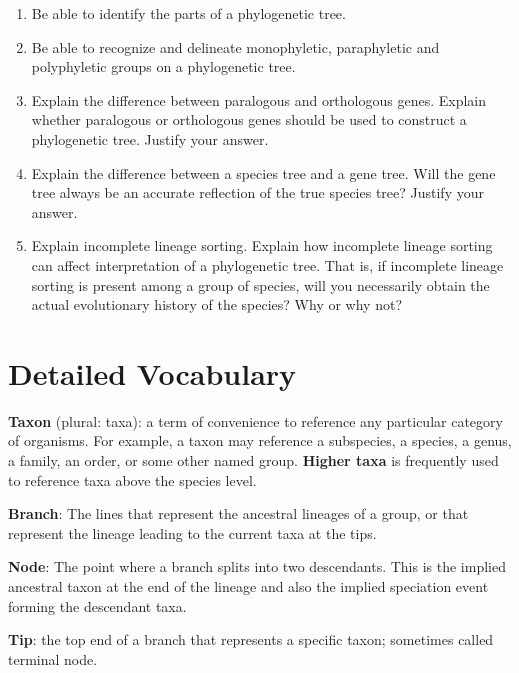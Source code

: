 \documentclass[letterpaper]{tufte-handout}
\begin{document}
\begin{enumerate}
	
	\item Be able to identify the parts of a phylogenetic tree.
	
	\item Be able to recognize and delineate monophyletic, paraphyletic and polyphyletic groups on a phylogenetic tree.

	\item Explain the difference between paralogous and orthologous genes. Explain whether paralogous or orthologous genes should be used to construct a phylogenetic tree. Justify your answer.
	
	\item Explain the difference between a species tree and a gene tree. Will the gene tree always be an accurate reflection of the true species tree? Justify your answer.
	
	\item Explain incomplete lineage sorting. Explain how incomplete lineage sorting can affect interpretation of a phylogenetic tree. That is, if incomplete lineage sorting is present among a group of species, will you necessarily obtain the actual evolutionary history of the species? Why or why not?
	
	

\end{enumerate}

\section{Detailed Vocabulary}

\textbf{Taxon} (plural: taxa): a term of convenience to reference any particular category of organisms. For example, a taxon may reference a subspecies, a species, a genus, a family, an order, or some other named group. \textbf{Higher taxa} is frequently used to reference taxa above the species level.

\noindent\textbf{Branch}: The lines that represent the ancestral lineages of a group, or that represent the lineage leading to the current taxa at the tips.

\noindent\textbf{Node}: The point where a branch splits into two descendants.  This is the implied ancestral taxon at the end of the lineage and also the implied speciation event forming the descendant taxa.

\noindent\textbf{Tip}: the top end of a branch that represents a specific taxon; sometimes called terminal node.
\end{document}
